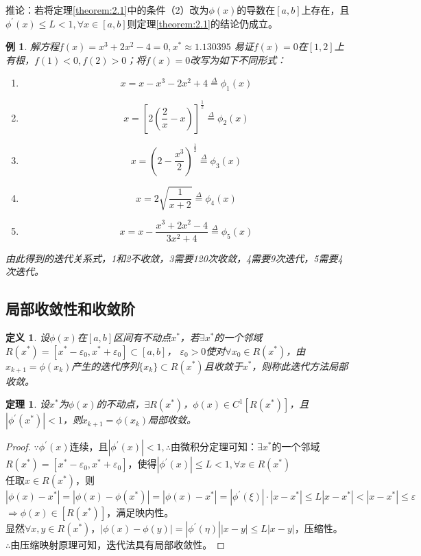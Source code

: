 \documentclass[a4paper]{article}
\newtheorem{definition}{定义}[section]
\newtheorem{theorem}{定理}[section]
\newtheorem{example}{例}[section]
\begin{document}
推论：若将定理\ref{theorem:2.1}中的条件（2）改为$\phi(x)$的导数在$[a,b]$上存在，且$\phi^{'}(x)\le L<1, \forall x\in[a,b]$则定理\ref{theorem:2.1}的结论仍成立。

\begin{example}
    解方程$f(x)=x^3+2x^2-4=0, x^*\approx 1.130395$
    易证$f(x)=0$在$[1,2]$上有根，$f(1)<0,f(2)>0$；将$f(x)=0$改写为如下不同形式：
    \begin{enumerate}
        \item $$x=x-x^3-2x^2+4\overset{\Delta}{=} \phi_1(x)$$
        \item $$x=[2(\frac{2}{x}-x)]^{\frac{1}{2}} \overset{\Delta}{=} \phi_2(x)$$
        \item $$x=(2-\frac{x^3}{2})^\frac{1}{2}\overset{\Delta}{=} \phi_3(x) $$
        \item $$x=2\sqrt{\frac{1}{x+2}}\overset{\Delta}{=} \phi_4(x)$$
        \item $$x=x-\frac{x^3+2x^2-4}{3x^2+4}\overset{\Delta}{=} \phi_5(x)$$
    \end{enumerate}
    
    由此得到的迭代关系式，1和2不收敛，3需要120次收敛，4需要9次迭代，5需要4次迭代。
\end{example}

\subsection{局部收敛性和收敛阶}
\begin{definition}
    设$\phi(x)$在$[a,b]$区间有不动点$x^*$，若$\exists x^*$的一个邻域$R(x^*)=[x^*-\varepsilon_0, x^*+\varepsilon_0]\subset [a,b] $，
    $\varepsilon_0>0$使对$\forall x_0\in R(x^*)$，由$x_{k+1}=\phi(x_k) $产生的迭代序列$\{x_k\}\subset R(x^*)$且收敛于$x^*$，则称此迭代方法局部收敛。
\end{definition}

\begin{theorem}
    设$x^*$为$\phi(x)$的不动点，$\exists R(x^*)$，$\phi(x)\in C^1[R(x^*)]$，且$|\phi^{'}(x^*)|<1$，则$x_{k+1}=\phi(x_k) $局部收敛。
\end{theorem}
\begin{proof}
    $\because \phi^{'}(x)$连续，且$|\phi^{'}(x)|<1, \therefore$由微积分定理可知：$\exists x^*$的一个邻域$R(x^*)=[x^*-\varepsilon_0, x^*+\varepsilon_0]$，使得$|\phi^{'}(x)|\le L<1, \forall x\in R(x^*)$\\
    任取$x\in R(x^*)$，则$|\phi(x)-x^*|=|\phi(x)-\phi(x^*)|=|\phi(x)-x^*|=|\phi^{'}(\xi)|\cdot|x-x^*|\le L|x-x^*|<|x-x^*|\le \varepsilon$\\
    $\Rightarrow \phi(x)\in [R(x^*)]$，满足映内性。\\
    显然$\forall x, y\in R(x^*) $，$|\phi(x)-\phi(y)|=|\phi^{'}(\eta)||x-y|\le L|x-y|$，压缩性。\\
    $\therefore$由压缩映射原理可知，迭代法具有局部收敛性。
\end{proof}
\end{document}
